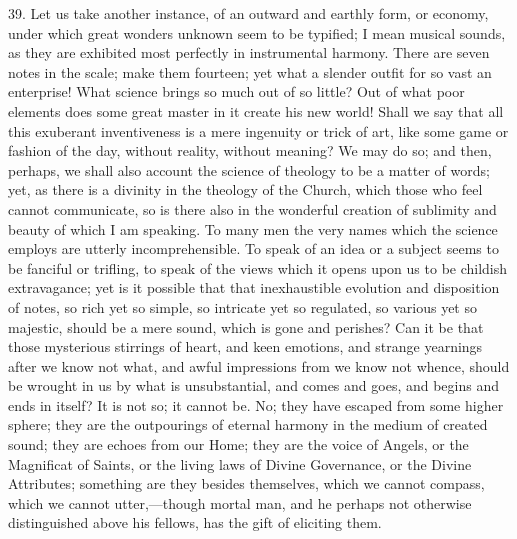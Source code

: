 39. Let us take another instance, of an outward and earthly form,
or economy, under which great wonders unknown seem to be typified; I
mean musical sounds, as they are exhibited most perfectly in
instrumental harmony. There are seven notes in the scale; make them
fourteen; yet what a slender outfit for so vast an enterprise! What
science brings so much out of so little? Out of what poor elements
does some great master in it create his new world! Shall we say that
all this exuberant inventiveness is a mere ingenuity or trick of art,
like some game or fashion of the day, without reality, without
meaning? We may do so; and then, perhaps, we shall also account the
science of theology to be a matter of words; yet, as there is a
divinity in the theology of the Church, which those who feel cannot
communicate, so is there also in the wonderful creation of sublimity
and beauty of which I am speaking. To many men the very names which
the science employs are utterly incomprehensible. To speak of an idea
or a subject seems to be fanciful or trifling, to speak of the views
which it opens upon us to be childish extravagance; yet is it possible
that that inexhaustible evolution and disposition of notes, so rich
yet so simple, so intricate yet so regulated, so various yet so
majestic, should be a mere sound, which is gone and perishes? Can it
be that those mysterious stirrings of heart, and keen emotions, and
strange yearnings after we know not what, and awful impressions from
we know not whence, should be wrought in us by what is unsubstantial,
and comes and goes, and begins and ends in itself? It is not so; it
cannot be. No; they have escaped from some higher sphere; they are the
outpourings of eternal harmony in the medium of created sound; they
are echoes from our Home; they are the voice of Angels, or the
Magnificat of Saints, or the living laws of Divine Governance, or the
Divine Attributes; something are they besides themselves, which we
cannot compass, which we cannot utter,—though mortal man, and he
perhaps not otherwise distinguished above his fellows, has the gift of
eliciting them.

